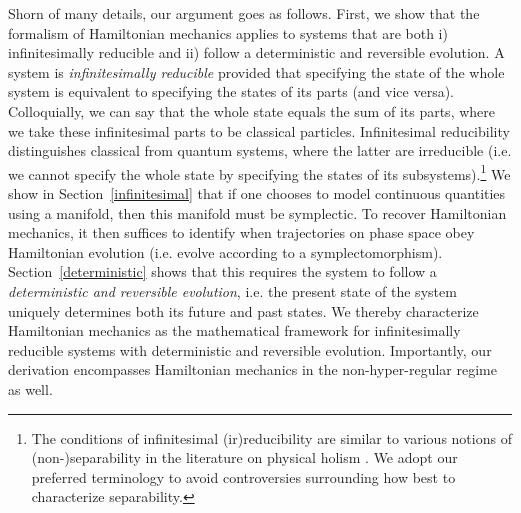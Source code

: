 \documentclass[12pt, twoside]{article}
\begin{document}
Shorn of many details, our argument goes as follows. First, we show that the formalism of Hamiltonian mechanics applies to systems that are both i) infinitesimally reducible and ii) follow a deterministic and reversible evolution. A system is \textit{infinitesimally reducible} provided that specifying the state of the whole system is equivalent to specifying the states of its parts (and vice versa). Colloquially, we can say that the whole state equals the sum of its parts, where we take these infinitesimal parts to be classical particles. Infinitesimal reducibility distinguishes classical from quantum systems, where the latter are irreducible (i.e. we cannot specify the whole state by specifying the states of its subsystems).\footnote{The conditions of infinitesimal (ir)reducibility are similar to various notions of (non-)separability in the literature on physical holism \parencites[46, 124]{Healey}. We adopt our preferred terminology to avoid controversies surrounding how best to characterize separability.} We show in Section~\ref{infinitesimal} that {\color{green} if one chooses to model continuous quantities using a manifold, then this manifold must be symplectic.} To recover Hamiltonian mechanics, it then suffices to identify when trajectories on phase space obey Hamiltonian evolution (i.e. evolve according to a symplectomorphism). Section~\ref{deterministic} shows that this requires the system to follow a \textit{deterministic and reversible evolution}, i.e. the present state of the system uniquely determines both its future and past states. We thereby characterize Hamiltonian mechanics as the mathematical framework for infinitesimally reducible systems with deterministic and reversible evolution. {\color{green} Importantly, our derivation encompasses Hamiltonian mechanics in the non-hyper-regular regime as well.}
\end{document}

